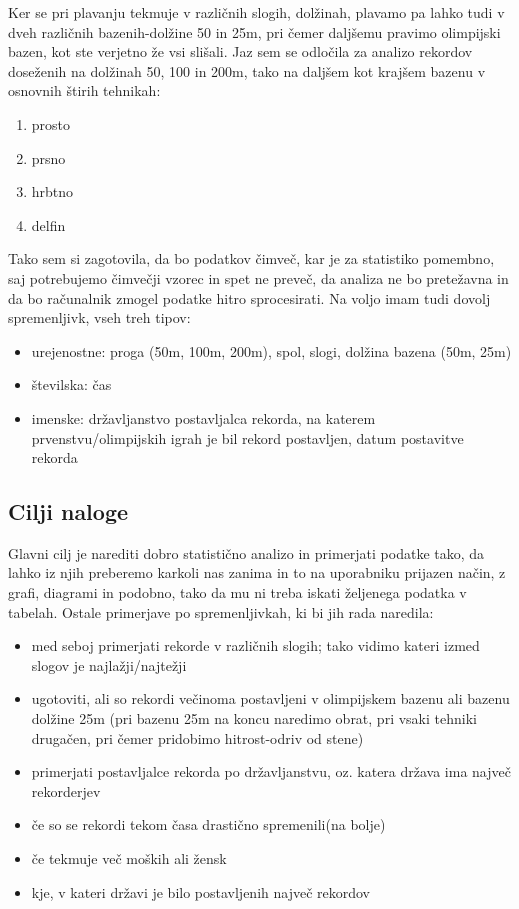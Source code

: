 \documentclass[10pt]{article}
\begin{document}
Ker se pri plavanju tekmuje v različnih slogih, dolžinah, plavamo pa lahko tudi v dveh različnih bazenih-dolžine 50 in 25m, pri čemer daljšemu pravimo olimpijski bazen, kot ste verjetno že vsi slišali. Jaz sem se odločila za analizo rekordov doseženih na dolžinah 50, 100 in 200m, tako na daljšem kot krajšem bazenu v osnovnih štirih tehnikah:
\begin{enumerate}
\item prosto
\item prsno
\item hrbtno
\item delfin
\end{enumerate}

Tako sem si zagotovila, da bo podatkov čimveč, kar je za statistiko pomembno, saj potrebujemo čimvečji vzorec in spet ne preveč, da analiza ne bo pretežavna in da bo računalnik zmogel podatke hitro sprocesirati. Na voljo imam tudi dovolj spremenljivk, vseh treh tipov:
\begin{itemize}
\item urejenostne: proga (50m, 100m, 200m), spol, slogi, dolžina bazena (50m, 25m)
\item številska: čas
\item imenske: državljanstvo postavljalca rekorda, na katerem prvenstvu/olimpijskih igrah je bil rekord postavljen, datum postavitve rekorda
\end{itemize}

\subsection{Cilji naloge}


Glavni cilj je narediti dobro statistično analizo in primerjati podatke tako, da lahko iz njih preberemo karkoli nas zanima in to na uporabniku prijazen način, z grafi, diagrami in podobno, tako da mu ni treba iskati željenega podatka v tabelah. Ostale primerjave po spremenljivkah, ki bi jih rada naredila:
\begin{itemize}
\item med seboj primerjati rekorde v različnih slogih; tako vidimo kateri izmed slogov je najlažji/najtežji
\item ugotoviti, ali so rekordi večinoma postavljeni v olimpijskem bazenu ali bazenu dolžine 25m (pri bazenu 25m na koncu naredimo obrat, pri vsaki tehniki drugačen, pri čemer pridobimo hitrost-odriv od stene)
\item primerjati postavljalce rekorda po državljanstvu, oz. katera država ima največ rekorderjev
\item če so se rekordi tekom časa drastično spremenili(na bolje)
\item če tekmuje več moških ali žensk
\item kje, v kateri državi je bilo postavljenih največ rekordov
\end{itemize}
\end{document}
